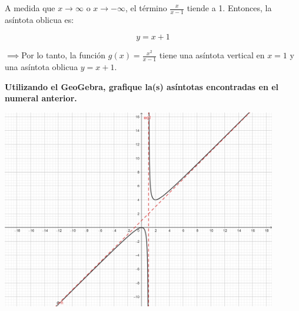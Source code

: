\documentclass[answers]{exam} %
\begin{document}
\begin{questions}
\begin{solution}
		A medida que \( x \to \infty \) o \( x \to -\infty \), el término \( \frac{x}{x-1} \) tiende a 1. Entonces, la asíntota oblicua es:

		\[
			y = x + 1
		\]

		$\implies$Por lo tanto, la función \( g(x) = \frac{x^2}{x-1} \) tiene una asíntota vertical en \( x = 1 \) y una asíntota oblicua \( y = x + 1 \).
	\end{solution}


	\vspace{0.5cm}

	\question \large\textbf{Utilizando el GeoGebra, grafique la(s) asíntotas encontradas en el numeral anterior.}
	\begin{minipage}{\textwidth}
		\centering
		\includegraphics[width=0.9\textwidth]{public/g2.png}\\
	\end{minipage}


\end{questions}
\end{document}
